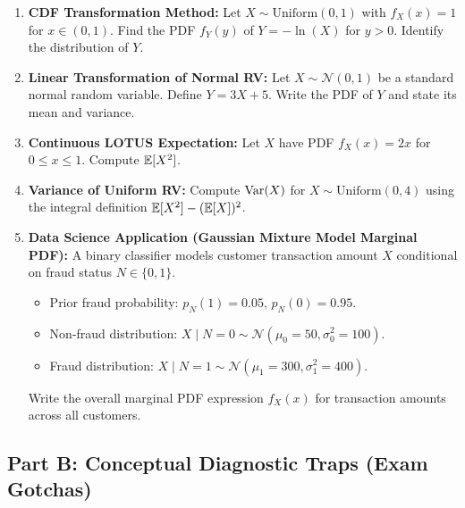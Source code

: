 \begin{enumerate}
\item \textbf{CDF Transformation Method:} Let $X \sim \text{Uniform}(0, 1)$ with $f_X(x) = 1$ for $x \in (0, 1)$. Find the PDF $f_Y(y)$ of $Y = -\ln(X)$ for $y > 0$. Identify the distribution of $Y$.

\item \textbf{Linear Transformation of Normal RV:} Let $X \sim \mathcal{N}(0, 1)$ be a standard normal random variable. Define $Y = 3X + 5$. Write the PDF of $Y$ and state its mean and variance.

\item \textbf{Continuous LOTUS Expectation:} Let $X$ have PDF $f_X(x) = 2x$ for $0 \le x \le 1$. Compute $\mathbb{E}[X^2]$.

\item \textbf{Variance of Uniform RV:} Compute $\operatorname{Var}(X)$ for $X \sim \text{Uniform}(0, 4)$ using the integral definition $\mathbb{E}[X^2] - (\mathbb{E}[X])^2$.

\item \textbf{Data Science Application (Gaussian Mixture Model Marginal PDF):} A binary classifier models customer transaction amount $X$ conditional on fraud status $N \in \{0, 1\}$.
\begin{itemize}
    \item Prior fraud probability: $p_N(1) = 0.05$, $p_N(0) = 0.95$.
    \item Non-fraud distribution: $X \mid N=0 \sim \mathcal{N}(\mu_0 = 50, \sigma_0^2 = 100)$.
    \item Fraud distribution: $X \mid N=1 \sim \mathcal{N}(\mu_1 = 300, \sigma_1^2 = 400)$.
\end{itemize}
    Write the overall marginal PDF expression $f_X(x)$ for transaction amounts across all customers.
\end{enumerate}

\subsection*{Part B: Conceptual Diagnostic Traps (Exam Gotchas)}

